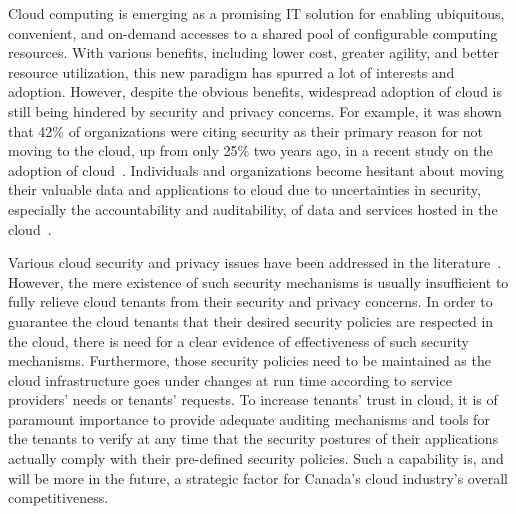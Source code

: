 \documentclass[12pt]{article}
\begin{document}

Cloud computing is emerging as a promising IT solution for enabling
ubiquitous, convenient, and on-demand accesses to a shared pool of
configurable computing resources. With various benefits, including
lower cost, greater agility, and better resource utilization, this new
paradigm has spurred a lot of interests and adoption. However, despite
the obvious benefits, widespread adoption of cloud is still being
hindered by security and privacy concerns. For example, it was shown
that 42\% of organizations were citing security as their primary
reason for not moving to the cloud, up from only 25\% two years ago,
in a recent study on the adoption of
cloud~\cite{bitglass}. Individuals and organizations become hesitant
about moving their valuable data and applications to cloud due to
uncertainties in security, especially the accountability and
auditability, of data and services hosted in the cloud~\cite{ko}.

Various cloud security and privacy issues have been addressed in the
literature~\cite{ryan2013cloud,subashini2011survey}. However, the mere
existence of such security mechanisms is usually insufficient to fully
relieve cloud tenants from their security and privacy concerns. In
order to guarantee the cloud tenants that their desired security
policies are respected in the cloud, there is need for a clear
evidence of effectiveness of such security mechanisms. Furthermore,
those security policies need to be maintained as the cloud
infrastructure goes under changes at run time according to service
providers' needs or tenants' requests.  To increase tenants' trust in
cloud, it is of paramount importance to provide adequate auditing
mechanisms and tools for the tenants to verify at any time that the
security postures of their applications actually comply with their
pre-defined security policies. Such a capability is, and will be more
in the future, a strategic factor for Canada's cloud industry's
overall competitiveness.
\end{document}

